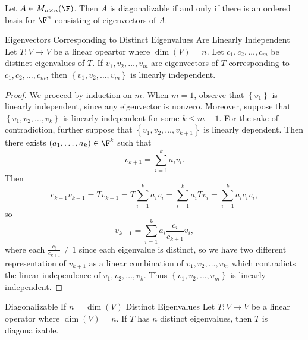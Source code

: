 \documentclass[linearalgebraI]{subfiles}
\begin{document}
    \clearpage
    \begin{cor}{}
        Let $A\in M_{n\times n}(\F)$. Then $A$ is diagonalizable if and only if there is an ordered basis for $\F^n$ consisting of eigenvectors of $A$.
    \end{cor}	

    \begin{prop}{Eigenvectors Corresponding to Distinct Eigenvalues Are Linearly Independent}
        Let $T:V\to V$ be a linear opeartor where $\dim(V) = n$. Let $c_1, c_2, \ldots, c_m$ be distinct eigenvalues of $T$. If $v_1, v_2, \ldots, v_m$ are eigenvectors of $T$ corresponding to $c_1, c_2, \ldots, c_m$, then $\left\lbrace v_1, v_2, \ldots, v_m \right\rbrace$ is linearly independent.
    \end{prop}

    \begin{proof}
        We proceed by induction on $m$. When $m=1$, observe that $\left\lbrace v_1 \right\rbrace$ is linearly independent, since any eigenvector is nonzero. Moreover, suppose that $\left\lbrace v_1, v_2, \ldots, v_k \right\rbrace$ is linearly independent for some $k\leq m-1$. For the sake of contradiction, further suppose that $\left\lbrace v_1, v_2, \ldots, v_{k+1} \right\rbrace$ is linearly dependent. Then there exists $(a_1, \ldots, a_k)\in \F^k$ such that
        \begin{equation*}
            v_{k+1} = \sum^k_{i=1} a_iv_i.
        \end{equation*}
        Then
        \begin{equation*}
            c_{k+1}v_{k+1} = Tv_{k+1} = T \sum^k_{i=1} a_iv_i = \sum^k_{i=1} a_iTv_i = \sum^k_{i=1} a_ic_iv_i,
        \end{equation*}
        so
        \begin{equation*}
            v_{k+1} = \sum^k_{i=1} a_i \frac{c_i}{c_{k+1}} v_i,
        \end{equation*}
        where each $\frac{c_i}{c_{k+1}}\neq 1$ since each eigenvalue is distinct, so we have two different representation of $v_{k+1}$ as a linear combination of $v_1, v_2, \ldots, v_k$, which contradicts the linear independence of $v_1, v_2, \ldots, v_k$. Thus $\left\lbrace v_1, v_2, \ldots, v_m \right\rbrace$ is linearly independent.
    \end{proof}

    \begin{cor}{Diagonalizable If $n=\dim(V)$ Distinct Eigenvalues}
        Let $T:V\to V$ be a linear operator where $\dim(V) = n$. If $T$ has $n$ distinct eigenvalues, then $T$ is diagonalizable.
    \end{cor}
\end{document}
